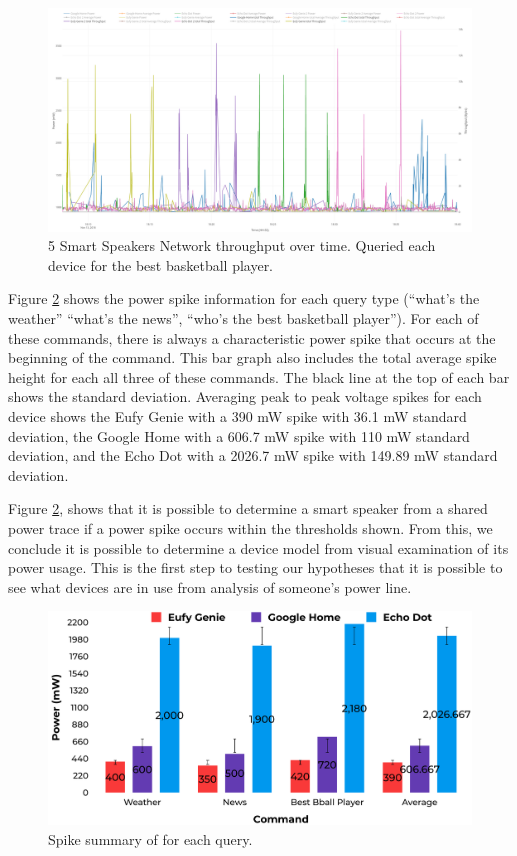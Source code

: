 \begin{figure}[H]
  \centering
  \includegraphics[width=1\textwidth]{figures/bestBballNetwork.png}
  \caption{5 Smart Speakers Network throughput over time. Queried each device for the best basketball player.}
  \label{fig:bestBballNetwork}
\end{figure}

Figure \ref{fig:spikeVoltages} shows the power spike information for each query type (``what's the weather'' ``what's the news'', ``who's the best basketball player''). For each of these commands, there is always a characteristic power spike that occurs at the beginning of the command. This bar graph also includes the total average spike height for each all three of these commands. The black line at the top of each bar shows the standard deviation. Averaging peak to peak voltage spikes for each device shows the Eufy Genie with a 390 mW spike with 36.1 mW standard deviation, the Google Home with a 606.7 mW spike with 110 mW standard deviation, and the Echo Dot with a 2026.7 mW spike with 149.89 mW standard deviation.

Figure \ref{fig:spikeVoltages}, shows that it is possible to determine a smart speaker from a shared power trace if a power spike occurs within the thresholds shown. From this, we conclude it is possible to determine a device model from visual examination of its power usage. This is the first step to testing our hypotheses that it is possible to see what devices are in use from analysis of someone's power line.

\begin{figure}[H]
  \centering
  \includegraphics[width=1\textwidth]{figures/spikeVoltages.png}
  \caption{Spike summary of for each query.}
  \label{fig:spikeVoltages}
\end{figure}


